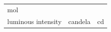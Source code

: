{\begin{tabular}[t]{|l|l|l|}
        mol%
     \tabularnewline\cline{1-1}\cline{2-2}\cline{3-3}
    
    
        luminous intensity &
    
    
        candela &
    
    
        cd%
     \tabularnewline\cline{1-1}\cline{2-2}\cline{3-3}
    \end{tabular}} %
        \addtolength{\mytableboxheight}{\mytableboxdepth}
        \addtocounter{footnote}{-0}
        
